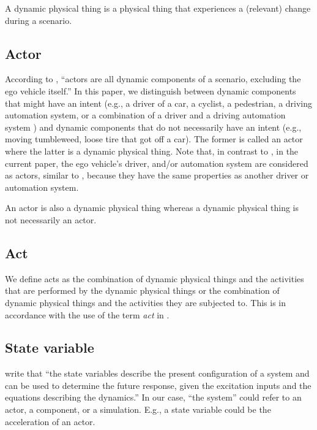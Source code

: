 A dynamic physical thing is a physical thing that experiences a (relevant) change during a scenario. 
\cendc



\subsection{Actor}
\label{sec:actor}

According to \textcite{catapult2018musicc}, ``actors are all dynamic components of a scenario, excluding the ego vehicle itself.'' \cstartc In this paper, we distinguish between dynamic components that might have an intent (e.g., a driver of a car, a cyclist, a pedestrian, a driving automation system, or a combination of a driver and a driving automation system \autocite{geyer2014}) and dynamic components that do not necessarily have an intent (e.g., moving tumbleweed, loose tire that got off a car). The former is called an actor where the latter is a dynamic physical thing. \cendc Note that, in contrast to \autocite{catapult2018musicc}, in the current paper, the ego vehicle's driver, and/or automation system are considered as actors, similar to \autocite{geyer2014},  because they have the same properties as another driver or automation system.

\cstartc
\begin{remark}
	An actor is also a dynamic physical thing whereas a dynamic physical thing is not necessarily an actor.
\end{remark}
\cendc



\subsection{Act}
\label{sec:act}

We define acts as the combination of \cstartc dynamic physical things \cendc and the activities that are performed by the dynamic physical things or the combination of dynamic physical things and the activities they are subjected to.  %
This is in accordance with the use of the term \emph{act} in \autocite{openscenario}. 

 
\subsection{State variable} 
\label{sec:state variable}
\textcite[p.~163]{dorf2011modern} write that ``the state variables describe the present configuration of a system and can be used to determine the future response, given the excitation inputs and the equations describing the dynamics.'' In our case, ``the system'' could refer to an actor, a component, or a simulation. E.g., a state variable could be the acceleration of an actor.

